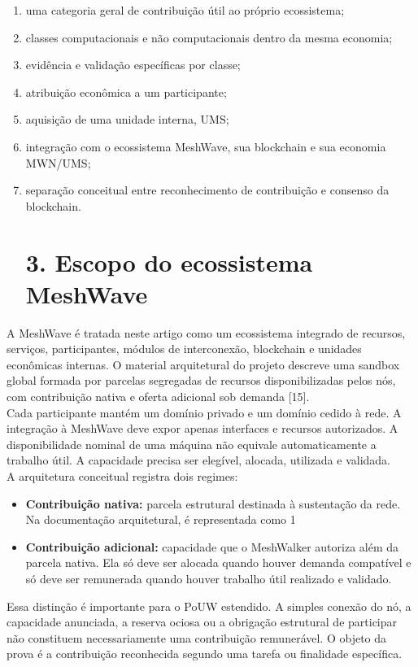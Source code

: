 \documentclass[12pt,a4paper]{article}
\begin{document}
\begin{enumerate}
\item uma categoria geral de contribuição útil ao próprio ecossistema;
\item classes computacionais e não computacionais dentro da mesma economia;
\item evidência e validação específicas por classe;
\item atribuição econômica a um participante;
\item aquisição de uma unidade interna, UMS;
\item integração com o ecossistema MeshWave, sua blockchain e sua economia MWN/UMS;
\item separação conceitual entre reconhecimento de contribuição e consenso da blockchain.


\section{3. Escopo do ecossistema MeshWave}

\end{enumerate}
A MeshWave é tratada neste artigo como um ecossistema integrado de recursos, serviços, participantes, módulos de interconexão, blockchain e unidades econômicas internas. O material arquitetural do projeto descreve uma sandbox global formada por parcelas segregadas de recursos disponibilizadas pelos nós, com contribuição nativa e oferta adicional sob demanda [15].\\

Cada participante mantém um domínio privado e um domínio cedido à rede. A integração à MeshWave deve expor apenas interfaces e recursos autorizados. A disponibilidade nominal de uma máquina não equivale automaticamente a trabalho útil. A capacidade precisa ser elegível, alocada, utilizada e validada.\\

A arquitetura conceitual registra dois regimes:\\

\begin{itemize}
\item \textbf{Contribuição nativa:} parcela estrutural destinada à sustentação da rede. Na documentação arquitetural, é representada como 1\\%
\item \textbf{Contribuição adicional:} capacidade que o MeshWalker autoriza além da parcela nativa. Ela só deve ser alocada quando houver demanda compatível e só deve ser remunerada quando houver trabalho útil realizado e validado.

\end{itemize}
Essa distinção é importante para o PoUW estendido. A simples conexão do nó, a capacidade anunciada, a reserva ociosa ou a obrigação estrutural de participar não constituem necessariamente uma contribuição remunerável. O objeto da prova é a contribuição reconhecida segundo uma tarefa ou finalidade específica.\\
\end{document}
